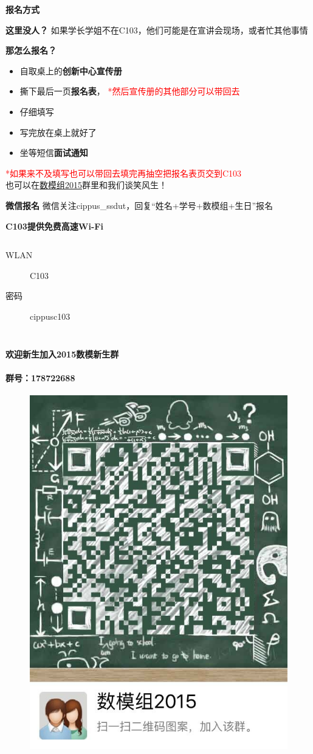 \documentclass[xcolor={usenames,dvipsnames}]{beamer}
\begin{document}
\begin{frame}{\textbf{报名方式}}\label{signin}
	\begin{exampleblock}{\textbf{这里没人？}}
		如果学长学姐不在C103，他们可能是在宣讲会现场，或者忙其他事情
	\end{exampleblock}
	
	\begin{alertblock}{\textbf{那怎么报名？}}
		\begin{itemize}
			\item 自取桌上的\textbf{创新中心宣传册}
			\item 撕下最后一页\textbf{报名表}， \textcolor{red}{*然后宣传册的其他部分可以带回去}
			\item 仔细填写
			\item 写完放在桌上就好了
			\item 坐等短信\textbf{面试通知}
		\end{itemize}
		\textcolor{red}{*如果来不及填写也可以带回去填完再抽空把报名表页交到C103} \\
		也可以在\textcolor{blue}{\hyperlink{qun}{数模组2015}}群里和我们谈笑风生！
	\end{alertblock}
	
	\begin{block}{\textbf{微信报名}}
		微信关注cippus\_ssdut，回复“姓名+学号+数模组+生日”报名 %
	\end{block}
	
\end{frame}

\begin{frame}{\textbf{C103提供免费高速Wi-Fi}}
\begin{columns}
{\LARGE 
    \begin{description}
        \item[WLAN] C103
        \item[密码] cippusc103
    \end{description}
}
\end{columns}
\end{frame}

\begin{frame}{\textbf{欢迎新生加入2015数模新生群}}
\framesubtitle{群号：178722688}
	\begin{figure}
		\includegraphics[width=.45\textwidth]{qq.jpg}
		\label{qun}
	\end{figure}

\end{frame}
\end{document}
